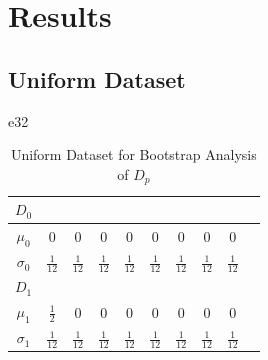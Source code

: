 \documentclass{article}
\begin{document}
	\section{Results}
	
	
	\subsection*{\small Uniform Dataset}
	
	\begin{table}[ht]
		\caption{Uniform Dataset for Bootstrap Analysis of $D_p$}e32
		\centering %
		\begin{tabular}{c c c c c c c c c c} %
			$D_0$ &  &  &  \\ [0.5ex] %
			\hline %
			$\mu_0$ & 0 & 0 & 0 & 0 & 0 & 0 & 0 & 0\\[0.5ex] %
			$\sigma_0$ & \( \frac{1}{12} \) & \( \frac{1}{12} \) & \( \frac{1}{12} \) & \( \frac{1}{12} \) & \( \frac{1}{12} \) & \( \frac{1}{12} \) & \( \frac{1}{12} \) & \( \frac{1}{12} \) &  \\[2ex]
			
			$D_1$ & \\ [0.5ex]
			
			\hline
			$\mu_1$ & \( \frac{1}{2} \) & 0 & 0 & 0 & 0 & 0 & 0 & 0\\[0.5ex] %
			$\sigma_1$ & \( \frac{1}{12} \) & \( \frac{1}{12} \) & \( \frac{1}{12} \) & \( \frac{1}{12} \) & \( \frac{1}{12} \) & \( \frac{1}{12} \) & \( \frac{1}{12} \) & \( \frac{1}{12} \) &  \\ [1ex] %
			\hline %
		\end{tabular}
		\label{table:nonlin} %
	\end{table}
	
\end{document}
